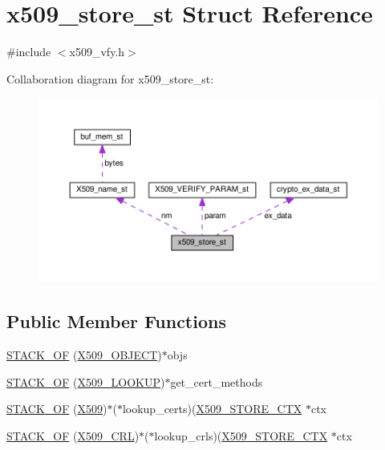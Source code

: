\hypertarget{structx509__store__st}{}\section{x509\+\_\+store\+\_\+st Struct Reference}
\label{structx509__store__st}


{\ttfamily \#include $<$x509\+\_\+vfy.\+h$>$}



Collaboration diagram for x509\+\_\+store\+\_\+st\+:
\nopagebreak
\begin{figure}[H]
\begin{center}
\leavevmode
\includegraphics[width=350pt]{structx509__store__st__coll__graph}
\end{center}
\end{figure}
\subsection*{Public Member Functions}
\begin{DoxyCompactItemize}
\item 
\hyperlink{structx509__store__st_a1776bb2f46d4e05fb8fb6fcab0c20083}{S\+T\+A\+C\+K\+\_\+\+OF} (\hyperlink{x509__vfy_8h_a49c000712efcfeff1e403cb1242052e9}{X509\+\_\+\+O\+B\+J\+E\+CT})$\ast$objs
\item 
\hyperlink{structx509__store__st_a7f1a555ef706f624180a55c3e87225db}{S\+T\+A\+C\+K\+\_\+\+OF} (\hyperlink{x509__vfy_8h_afcefc7fb9c7573debf6c1d28b28ff618}{X509\+\_\+\+L\+O\+O\+K\+UP})$\ast$get\+\_\+cert\+\_\+methods
\item 
\hyperlink{structx509__store__st_aee14512a7342ddda8e21732da5bdb510}{S\+T\+A\+C\+K\+\_\+\+OF} (\hyperlink{ossl__typ_8h_a4f666bde6518f95deb3050c54b408416}{X509})$\ast$($\ast$lookup\+\_\+certs)(\hyperlink{ossl__typ_8h_ae681945a2cf88d6337137dc0260a1545}{X509\+\_\+\+S\+T\+O\+R\+E\+\_\+\+C\+TX} $\ast$ctx
\item 
\hyperlink{structx509__store__st_aeb4d9b3b06b5132d4c48bdb68f5da2b1}{S\+T\+A\+C\+K\+\_\+\+OF} (\hyperlink{ossl__typ_8h_ac8661d2485c2c8da5fd7dd26b846f4bf}{X509\+\_\+\+C\+RL})$\ast$($\ast$lookup\+\_\+crls)(\hyperlink{ossl__typ_8h_ae681945a2cf88d6337137dc0260a1545}{X509\+\_\+\+S\+T\+O\+R\+E\+\_\+\+C\+TX} $\ast$ctx
\end{DoxyCompactItemize}
